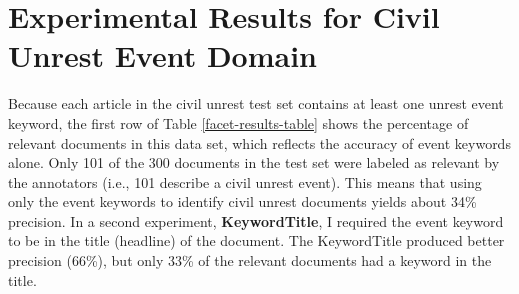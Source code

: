 \section{Experimental Results for Civil Unrest Event Domain}


Because each article in the civil unrest test set contains 
at least one unrest event keyword, 
the first row  of Table \ref{facet-results-table} shows 
the percentage of relevant documents in this data set, 
which reflects the accuracy 
of event keywords alone.
Only 101 of the 300 documents in the
test set were labeled as relevant by the annotators (i.e., 101 describe a
civil unrest event). This means that using only the event keywords
to identify civil unrest documents yields about 34\% precision. In
a second experiment, {\bf KeywordTitle}, I required the event keyword to be in
the title (headline) of the document. The KeywordTitle 
produced better precision (66\%), but only 33\% of the relevant
documents had a keyword in the title.

